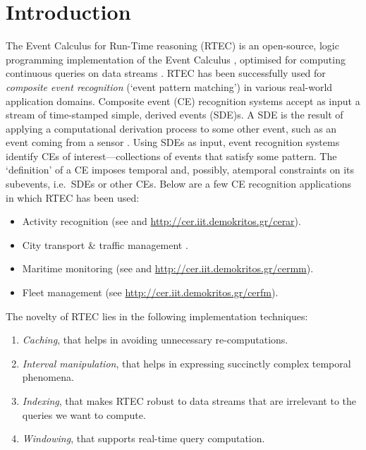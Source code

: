 \section{Introduction}

The Event Calculus for Run-Time reasoning (RTEC) is an open-source, logic programming implementation of the Event Calculus \cite{DBLP:journals/ngc/KowalskiS86}, optimised for computing continuous queries on data streams \cite{DBLP:journals/tkde/ArtikisSP15}. RTEC has been successfully used for \emph{composite event recognition}  (`event pattern matching') in various real-world application domains. Composite event (CE) recognition systems accept as input a stream of time-stamped simple, derived events (SDE)s. A SDE is the result of applying a computational derivation process to some other event, such as an event coming from a sensor \cite{EPTSglossary}. Using SDEs as input, event recognition systems identify CEs of interest---collections of events that satisfy some pattern. The `definition' of a CE  imposes temporal and, possibly, atemporal constraints on its subevents, i.e.~SDEs or other CEs. 
Below are a few CE recognition applications in which RTEC has been used:
%
\begin{itemize}
	\item Activity recognition (see \cite{DBLP:journals/tkde/ArtikisSP15} and \url{http://cer.iit.demokritos.gr/cerar}).
	\item City transport \& traffic management  \cite{DBLP:journals/tkde/ArtikisSP15, DBLP:conf/bigdataconf/ArtikisWGKG13, DBLP:conf/edbt/ArtikisWSBLPBMKMGMGK14}.
	\item Maritime monitoring (see \cite{DBLP:conf/debs/PitsikalisADRCJ19, DBLP:conf/edbt/PatroumpasAKVTP15} and \url{http://cer.iit.demokritos.gr/cermm}).
	\item Fleet management (see \cite{DBLP:journals/tplp/TsilionisKNDA19} \url{http://cer.iit.demokritos.gr/cerfm}).
\end{itemize}


The novelty of RTEC lies in the following implementation techniques:

\begin{enumerate}
	\item\textit{Caching}, that helps in avoiding unnecessary re-computations.
	\item\textit{Interval manipulation}, that helps in expressing succinctly complex temporal phenomena.
	\item\textit{Indexing}, that makes RTEC robust to data streams that are irrelevant to the queries we want to compute.
	\item\textit{Windowing}, that supports real-time query computation.
\end{enumerate}


